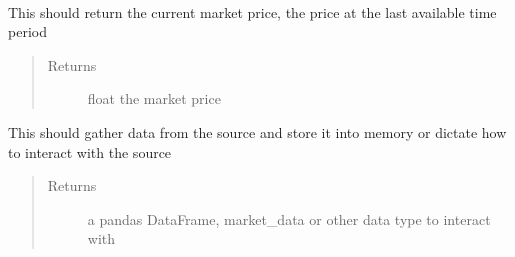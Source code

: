 \documentclass[letterpaper,10pt,english]{sphinxmanual}
\begin{document}
\begin{fulllineitems}
\label{\detokenize{market_data:risk_dash.market_data._MarketData}}~

\begin{fulllineitems}
\label{\detokenize{market_data:risk_dash.market_data._MarketData.current_price}}
This should return the current market price, the price at the last available time period
\begin{quote}\begin{description}
\item[{Returns}] \leavevmode
float the market price

\end{description}\end{quote}

\end{fulllineitems}


\begin{fulllineitems}
\label{\detokenize{market_data:risk_dash.market_data._MarketData.gather}}
This should gather data from the source and store it into memory or dictate how to interact with the source
\begin{quote}\begin{description}
\item[{Returns}] \leavevmode
a pandas DataFrame, market\_data or other data type to interact with

\end{description}\end{quote}

\end{fulllineitems}


\end{fulllineitems}

\end{document}
